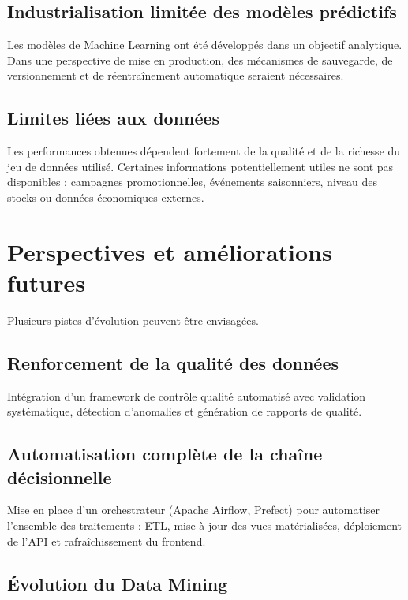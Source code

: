\documentclass[12pt,a4paper,twoside]{report}
\begin{document}
\subsection{Industrialisation limitée des modèles prédictifs}

Les modèles de Machine Learning ont été développés dans un objectif analytique. Dans une perspective de mise en production, des mécanismes de sauvegarde, de versionnement et de réentraînement automatique seraient nécessaires.

\subsection{Limites liées aux données}

Les performances obtenues dépendent fortement de la qualité et de la richesse du jeu de données utilisé. Certaines informations potentiellement utiles ne sont pas disponibles : campagnes promotionnelles, événements saisonniers, niveau des stocks ou données économiques externes.

\section{Perspectives et améliorations futures}

Plusieurs pistes d'évolution peuvent être envisagées.

\subsection{Renforcement de la qualité des données}

Intégration d'un framework de contrôle qualité automatisé avec validation systématique, détection d'anomalies et génération de rapports de qualité.

\subsection{Automatisation complète de la chaîne décisionnelle}

Mise en place d'un orchestrateur (Apache Airflow, Prefect) pour automatiser l'ensemble des traitements : ETL, mise à jour des vues matérialisées, déploiement de l'API et rafraîchissement du frontend.

\subsection{Évolution du Data Mining}
\end{document}
